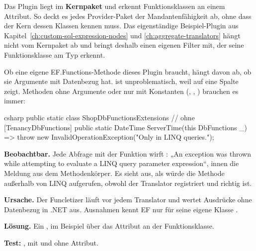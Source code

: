 Das Plugin liegt im \textbf{Kernpaket} und erkennt Funktionsklassen an einem Attribut. So
deckt es jedes Provider-Paket der Mandantenfähigkeit ab, ohne dass der Kern dessen Klassen
kennen muss. Das eigenständige Beispiel-Plugin aus Kapitel~\ref{ch:custom-sql-expression-nodes}
und \ref{ch:aggregate-translators} hängt nicht vom Kernpaket ab und bringt deshalb einen eigenen
Filter mit, der seine Funktionsklasse am Typ erkennt.

Ob eine eigene EF.Functions-Methode dieses Plugin braucht, hängt davon ab, ob sie
Argumente mit Datenbezug hat.
 ist
unproblematisch, weil  auf eine Spalte zeigt. Methoden ohne
Argumente oder nur mit Konstanten (,
, ) brauchen es
immer:

\begin{sourcecode}{csharp}
public static class ShopDbFunctionsExtensions          // ohne [TenancyDbFunctions]
{
    public static DateTime ServerTime(this DbFunctions _)
        => throw new InvalidOperationException("Only in LINQ queries.");
}
\end{sourcecode}

\begin{failure}
  \textbf{Beobachtbar.} Jede Abfrage mit der Funktion wirft
  : „An exception was thrown
  while attempting to evaluate a LINQ query parameter expression“, innen die Meldung aus dem
  Methodenkörper. Es sieht aus, als würde die Methode außerhalb von LINQ aufgerufen, obwohl
  der Translator registriert und richtig ist.

  \textbf{Ursache.} Der Funcletizer läuft vor jedem Translator und wertet Ausdrücke ohne
  Datenbezug in .NET aus. Ausnahmen kennt EF nur für seine eigene Klasse
  .

  \textbf{Lösung.} Ein
  , im
  Beispiel über das Attribut an der Funktionsklasse.

  \textbf{Test:}
  ,
  mit und ohne Attribut.
\end{failure}

